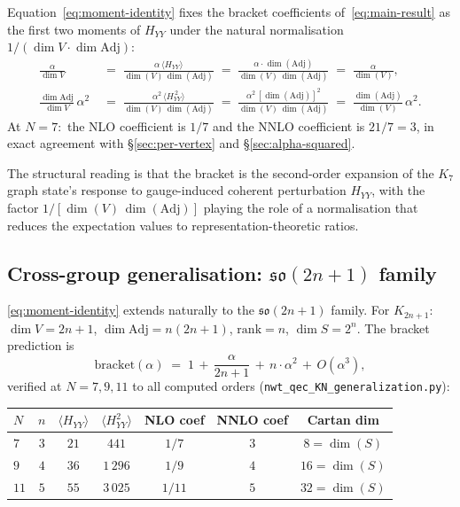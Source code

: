 \documentclass[11pt]{article}
\newcommand{\so}{\mathfrak{so}}
\newcommand{\Adj}{\mathrm{Adj}}
\newcommand{\rank}{\mathrm{rank}}
\begin{document}
Equation~\eqref{eq:moment-identity} fixes the bracket coefficients
of~\eqref{eq:main-result} as the first two moments of $H_{YY}$
under the natural normalisation $1/(\dim V \cdot \dim \Adj)$:
\begin{align}
  \frac{\alpha}{\dim V}
  &\;=\;
  \frac{\alpha\, \langle H_{YY}\rangle}{\dim(V)\,\dim(\Adj)}
  \;=\;
  \frac{\alpha \cdot \dim(\Adj)}{\dim(V)\,\dim(\Adj)}
  \;=\; \frac{\alpha}{\dim(V)},
  \label{eq:NLO-as-moment}
  \\
  \frac{\dim \Adj}{\dim V}\,\alpha^2
  &\;=\;
  \frac{\alpha^2\, \langle H_{YY}^{\,2}\rangle}{\dim(V)\,\dim(\Adj)}
  \;=\;
  \frac{\alpha^2\,[\dim(\Adj)]^2}{\dim(V)\,\dim(\Adj)}
  \;=\; \frac{\dim(\Adj)}{\dim(V)}\,\alpha^2.
  \label{eq:NNLO-as-moment}
\end{align}
At $N = 7$:\ the NLO coefficient is $1/7$ and the NNLO coefficient
is $21/7 = 3$, in exact agreement with \S\ref{sec:per-vertex} and
\S\ref{sec:alpha-squared}.

The structural reading is that the bracket is the second-order
expansion of the $K_7$ graph state's response to gauge-induced
coherent perturbation $H_{YY}$, with the factor
$1/[\dim(V)\,\dim(\Adj)]$ playing the role of a normalisation that
reduces the expectation values to representation-theoretic ratios.

\subsection{Cross-group generalisation: $\so(2n+1)$ family}
\label{sec:qec-general-N}

\eqref{eq:moment-identity} extends naturally to the $\so(2n+1)$
family.  For $K_{2n+1}$:\ $\dim V = 2n+1$, $\dim \Adj = n(2n+1)$,
$\rank = n$, $\dim S = 2^n$.  The bracket prediction is
\begin{equation}
  \mathrm{bracket}(\alpha)
  \;=\;
  1 \,+\, \frac{\alpha}{2n+1}
  \,+\, n \cdot \alpha^2
  \,+\, O(\alpha^3),
  \label{eq:bracket-N}
\end{equation}
verified at $N = 7, 9, 11$ to all computed orders
(\texttt{nwt\_qec\_KN\_generalization.py}):
\begin{center}
\begin{tabular}{lcccccc}
\toprule
$N$ & $n$ & $\langle H_{YY}\rangle$ & $\langle H_{YY}^2\rangle$
    & NLO coef & NNLO coef & Cartan dim \\
\midrule
$7$  & $3$ & $21$ & $441$    & $1/7$  & $3$ & $8 = \dim(S)$  \\
$9$  & $4$ & $36$ & $1\,296$ & $1/9$  & $4$ & $16 = \dim(S)$ \\
$11$ & $5$ & $55$ & $3\,025$ & $1/11$ & $5$ & $32 = \dim(S)$ \\
\bottomrule
\end{tabular}
\end{center}
\end{document}

